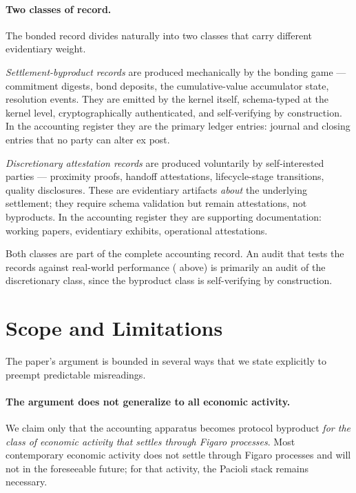 \documentclass[11pt,a4paper]{article}
\theoremstyle{definition}
\theoremstyle{remark}
\begin{document}
\paragraph{Two classes of record.}
The bonded record divides naturally into two classes that
carry different evidentiary weight.

\emph{Settlement-byproduct records} are produced mechanically
by the bonding game --- commitment digests, bond deposits,
the cumulative-value accumulator state, resolution events.
They are emitted by the kernel itself, schema-typed at the
kernel level, cryptographically authenticated, and
self-verifying by construction. In the accounting register
they are the primary ledger entries: journal and closing
entries that no party can alter ex post.

\emph{Discretionary attestation records} are produced
voluntarily by self-interested parties --- proximity proofs,
handoff attestations, lifecycle-stage transitions, quality
disclosures. These are evidentiary artifacts \emph{about} the
underlying settlement; they require schema validation but
remain attestations, not byproducts. In the accounting
register they are supporting documentation: working papers,
evidentiary exhibits, operational attestations.

Both classes are part of the complete accounting record. An
audit that tests the records against real-world performance
( above) is primarily an audit of the
discretionary class, since the byproduct class is
self-verifying by construction.

\section{Scope and Limitations}
\label{sec:scope}

The paper's argument is bounded in several ways that we
state explicitly to preempt predictable misreadings.

\paragraph{The argument does not generalize to all economic activity.}
We claim only that the accounting apparatus becomes
protocol byproduct \emph{for the class of economic activity
that settles through Figaro processes}. Most contemporary
economic activity does not settle through Figaro processes
and will not in the foreseeable future; for that activity,
the Pacioli stack remains necessary.
\end{document}

